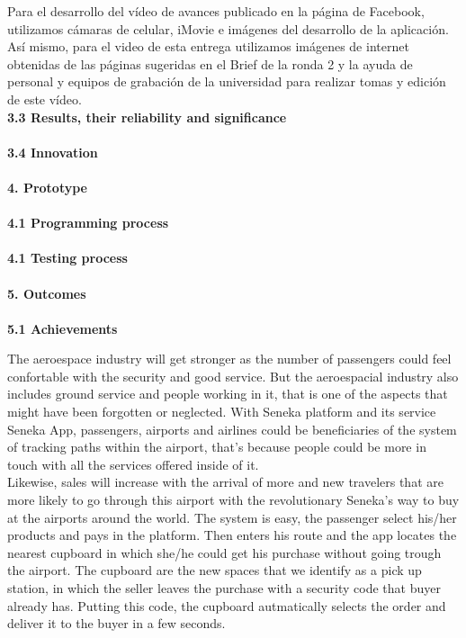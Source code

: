 \documentclass[]{article}
\begin{document}
Para el desarrollo del vídeo de avances publicado en la página de Facebook, utilizamos cámaras de celular, iMovie e imágenes del desarrollo de la aplicación. Así mismo, para el video de esta entrega utilizamos imágenes de internet obtenidas de las páginas sugeridas en el Brief de la ronda 2 y la ayuda de personal y equipos de grabación de la universidad para realizar tomas y edición de este vídeo. \\

\Large{\textbf{3.3 Results, their reliability and significance}\\}\\


\Large{\textbf{3.4 Innovation}\\}\\


\Large{\textbf{4. Prototype}\\}\\


\Large{\textbf{4.1 Programming process}\\}\\


\Large{\textbf{4.1 Testing process}\\}\\


\Large{\textbf{5. Outcomes}\\}\\

\Large{\textbf{5.1 Achievements}\\}

The aeroespace industry will get stronger as the number of passengers could feel confortable with the security and good service. But the aeroespacial industry also includes ground service and people working in it, that is one of the aspects that might have been forgotten or neglected. With Seneka platform and its service Seneka App, passengers, airports and airlines could be beneficiaries of the system of tracking paths within the airport, that's because people could be more in touch with all the services offered inside of it.\\

Likewise, sales will increase with the arrival of more and new travelers that are more likely to go through this airport with the revolutionary Seneka's way to buy at the airports around the world. The system is easy, the passenger select his/her products and pays in the platform. Then enters his route and the app locates the nearest cupboard in which she/he could get his purchase without going trough the airport. The cupboard are the new spaces that we identify as a pick up station, in which the seller leaves the purchase with a security code that buyer already has. Putting this code, the cupboard autmatically selects the order and deliver it to the buyer in a few seconds.\\
\end{document}
